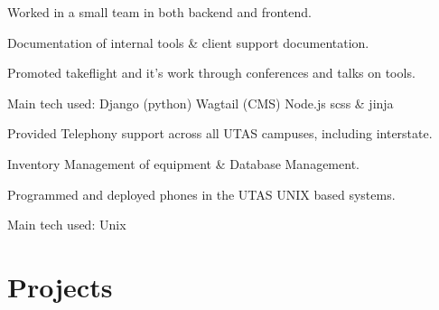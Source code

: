 \documentclass[a4paper]{deedy-resume-twopage} %
\begin{document}
\begin{minipage}[t]{0.66\textwidth}
  \begin{tightitemize}
  \item Worked in a small team in both backend and frontend.
  \item Documentation of internal tools \& client support documentation.
  \item Promoted takeflight and it's work through conferences and talks on tools.
  \end{tightitemize}
  Main tech used: \textbullet{} Django (python) \textbullet{} Wagtail (CMS) \textbullet{} Node.js \textbullet{} scss \& jinja

  \sectionspace %



  \begin{tightitemize}
  \item Provided Telephony support across all UTAS campuses, including interstate.
  \item Inventory Management of equipment \& Database Management.
  \item Programmed and deployed phones in the UTAS UNIX based systems.
  \end{tightitemize}
  Main tech used: \textbullet{} Unix

  \sectionspace %



  \section{Projects}



\end{minipage}
\end{document}
